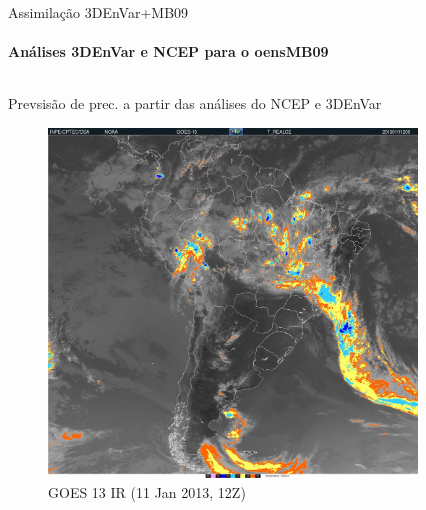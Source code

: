 \documentclass[10pt,aspectratio=169]{beamer}
\begin{document}
\begin{frame}{Assimilação 3DEnVar+MB09}
\framesubtitle{Análises 3DEnVar e NCEP para o oensMB09}
  \begin{columns}[t]
	  \vspace{2em}
    \begin{column}{.45\textwidth}
      \centering
    	Prevsisão de prec. a partir das análises do NCEP e 3DEnVar
      \begin{figure}[t]
			  \centering
				\includegraphics[width=0.8\linewidth]{./figs/goes13.jpg}
				\caption{GOES 13 IR (11 Jan 2013, 12Z)}
			\end{figure}
    \end{column}
    \begin{column}{.5\textwidth}
      \begin{figure}[H]
        \vspace{-2em}
				\centering
        \\

\end{figure}
\end{column}
\end{columns}
\end{frame}
\end{document}

